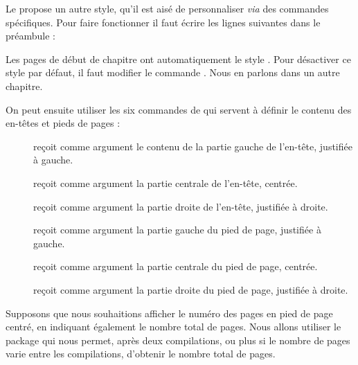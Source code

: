 Le  propose un autre style, qu'il est aisé de personnaliser \emph{via} des commandes spécifiques. Pour faire fonctionner  il faut écrire les lignes suivantes dans le préambule :

\begin{latexcode}
\usepackage{fancyhdr}
\pagestyle{fancy}
\end{latexcode}

\begin{plusloins}
Les pages de début de chapitre ont automatiquement le style . Pour désactiver ce style par défaut, il faut modifier le commande . Nous en parlons dans un autre chapitre. 
\end{plusloins}


On peut ensuite utiliser les six commandes de  qui servent à définir le contenu des en-têtes et pieds de pages :

\begin{description}
\item[] reçoit comme argument le contenu de la partie gauche de l'en-tête, justifiée à gauche.
\item[] reçoit comme argument la partie centrale de l'en-tête, centrée.
\item[] reçoit comme argument la partie droite de l'en-tête, justifiée à droite.
\item[] reçoit comme argument la partie gauche du pied de page, justifiée à gauche.
\item[] reçoit comme argument la partie centrale du pied de page, centrée.
\item[] reçoit comme argument la partie droite du pied de page, justifiée à droite.
\end{description}



Supposons que nous souhaitions afficher le numéro des pages en pied de page centré, en indiquant également le nombre total de pages. Nous allons utiliser le package  qui nous permet, après deux compilations, ou plus si le nombre de pages varie entre les compilations, d'obtenir le nombre total de pages.

\begin{latexcode}
\usepackage{fancyhdr}
\pagestyle{fancy}
\usepackage{totpages}
\cfoot{{\thepage} / \ref{TotPages}}
\end{latexcode}



